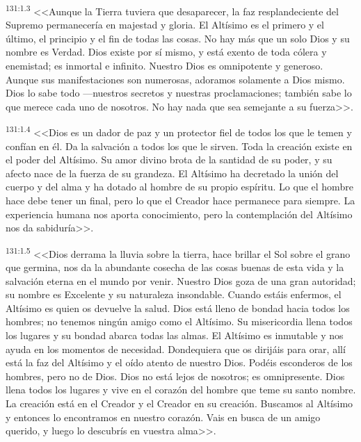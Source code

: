 \par 
\textsuperscript{131:1.3} <<Aunque la Tierra tuviera que desaparecer, la faz resplandeciente del Supremo permanecería en majestad y gloria. El Altísimo es el primero y el último, el principio y el fin de todas las cosas. No hay más que un solo Dios y su nombre es Verdad. Dios existe por sí mismo, y está exento de toda cólera y enemistad; es inmortal e infinito. Nuestro Dios es omnipotente y generoso. Aunque sus manifestaciones son numerosas, adoramos solamente a Dios mismo. Dios lo sabe todo ---nuestros secretos y nuestras proclamaciones; también sabe lo que merece cada uno de nosotros. No hay nada que sea semejante a su fuerza>>.

\par 
\textsuperscript{131:1.4} <<Dios es un dador de paz y un protector fiel de todos los que le temen y confían en él. Da la salvación a todos los que le sirven. Toda la creación existe en el poder del Altísimo. Su amor divino brota de la santidad de su poder, y su afecto nace de la fuerza de su grandeza. El Altísimo ha decretado la unión del cuerpo y del alma y ha dotado al hombre de su propio espíritu. Lo que el hombre hace debe tener un final, pero lo que el Creador hace permanece para siempre. La experiencia humana nos aporta conocimiento, pero la contemplación del Altísimo nos da sabiduría>>.

\par 
\textsuperscript{131:1.5} <<Dios derrama la lluvia sobre la tierra, hace brillar el Sol sobre el grano que germina, nos da la abundante cosecha de las cosas buenas de esta vida y la salvación eterna en el mundo por venir. Nuestro Dios goza de una gran autoridad; su nombre es Excelente y su naturaleza insondable. Cuando estáis enfermos, el Altísimo es quien os devuelve la salud. Dios está lleno de bondad hacia todos los hombres; no tenemos ningún amigo como el Altísimo. Su misericordia llena todos los lugares y su bondad abarca todas las almas. El Altísimo es inmutable y nos ayuda en los momentos de necesidad. Dondequiera que os dirijáis para orar, allí está la faz del Altísimo y el oído atento de nuestro Dios. Podéis esconderos de los hombres, pero no de Dios. Dios no está lejos de nosotros; es omnipresente. Dios llena todos los lugares y vive en el corazón del hombre que teme su santo nombre. La creación está en el Creador y el Creador en su creación. Buscamos al Altísimo y entonces lo encontramos en nuestro corazón. Vais en busca de un amigo querido, y luego lo descubrís en vuestra alma>>.

